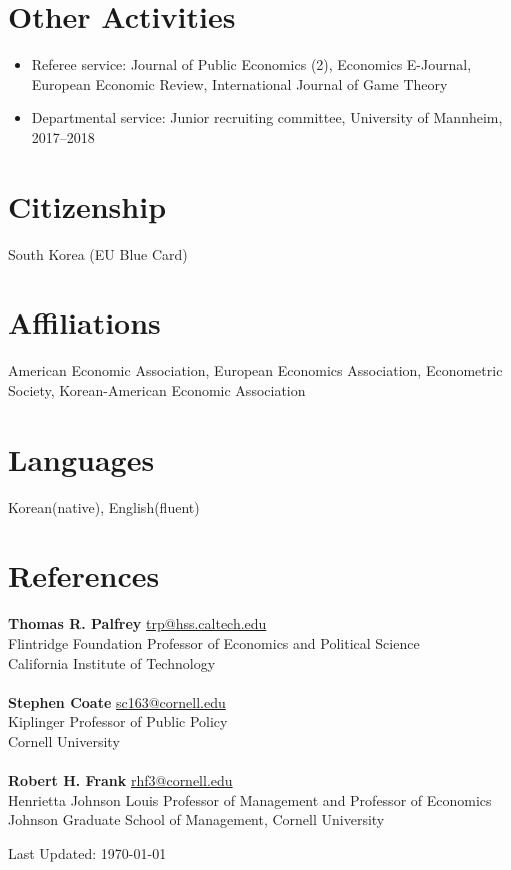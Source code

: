 \documentclass[margin, letterpaper]{res}
\begin{document}
\begin{resume}
\section{Other Activities}
\begin{itemize}
\item Referee service: Journal of Public Economics (2), Economics E-Journal, European Economic Review, International Journal of Game Theory
\item Departmental service: Junior recruiting committee, University of Mannheim, 2017--2018
\end{itemize}

\section{Citizenship} South Korea (EU Blue Card)%

\section{Affiliations} American Economic Association, European Economics Association, Econometric Society, Korean-American Economic Association

\section{Languages} Korean(native), English(fluent)

\section{References} \textbf{Thomas R. Palfrey} \href{mailto:trp@hss.caltech.edu}{trp@hss.caltech.edu}\\
Flintridge Foundation Professor of Economics and Political Science\\
California Institute of Technology\\\\
\textbf{Stephen Coate} \href{mailto:sc163@cornell.edu}{sc163@cornell.edu}\\
Kiplinger Professor of Public Policy\\
Cornell University\\\\
\textbf{Robert H. Frank} \href{mailto:rhf3@cornell.edu}{rhf3@cornell.edu}\\
Henrietta Johnson Louis Professor of Management and Professor of Economics\\
Johnson Graduate School of Management, Cornell University
\begin{flushright}
Last Updated: \today
\end{flushright}
\end{resume} 
\end{document}
